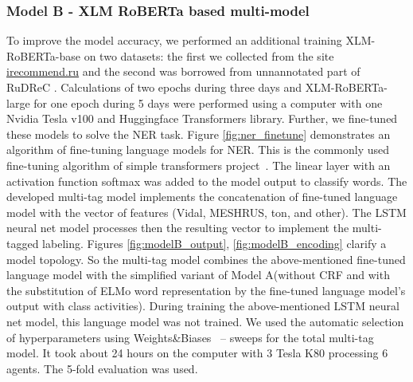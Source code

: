 \documentclass[a4paper,fleqn,longmktitle]{cas-dc}
\begin{document}

\subsubsection{Model B - XLM RoBERTa based multi-model}

To improve the model accuracy, we performed an additional training XLM-RoBERTa-base on two datasets:  the first we collected from the site \url{irecommend.ru} and the second was borrowed from unnannotated part of RuDReC \cite{tutubalina2020russian}.  Calculations of two epochs during three days and XLM-RoBERTa-large for one epoch during 5 days were performed using a computer with one Nvidia Tesla v100 and Huggingface Transformers library.  Further, we fine-tuned these models to solve the NER task. Figure \ref{fig:ner_finetune} demonstrates an algorithm of fine-tuning language models for NER. This is the commonly used fine-tuning algorithm of simple transformers project~\cite{rajapakse2019simpletransformers}. The linear layer with an activation function softmax was added to the model output to classify words. The developed multi-tag model implements the concatenation of fine-tuned language model with the vector of features (Vidal, MESHRUS, ton, and other). The LSTM neural net model processes then the resulting vector to implement the multi-tagged labeling. Figures \ref{fig:modelB_output}, \ref{fig:modelB_encoding} clarify a model topology. So the multi-tag model combines the above-mentioned fine-tuned language model with the simplified variant of Model A(without CRF and with the substitution of ELMo  word representation by the fine-tuned language model's output with class activities). During training the above-mentioned LSTM neural net model, this language model was not trained. We used the automatic selection of hyperparameters using Weights\&Biases~\cite{wandb} – sweeps for the total multi-tag model. It took about 24 hours on the computer with 3 Tesla K80 processing 6 agents. The 5-fold evaluation was used.
\end{document}
